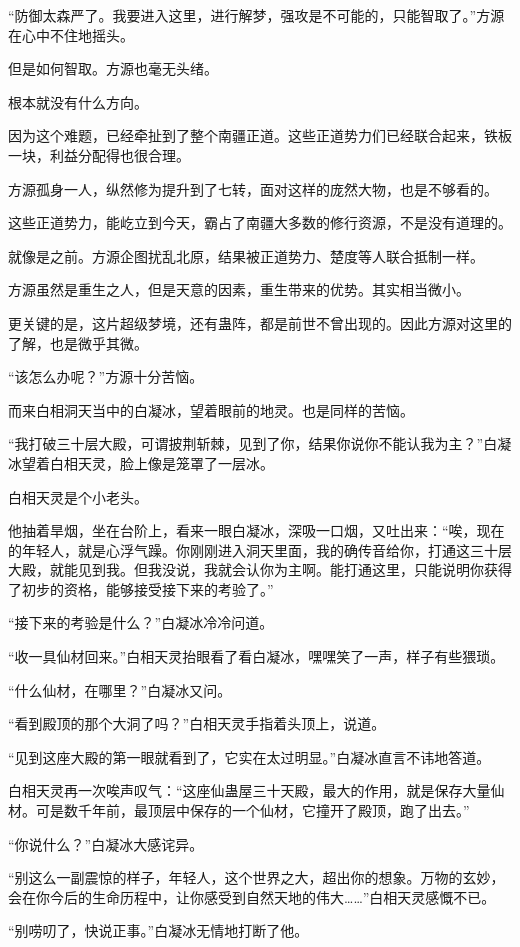 \begin{this_body}
“防御太森严了。我要进入这里，进行解梦，强攻是不可能的，只能智取了。”方源在心中不住地摇头。

但是如何智取。方源也毫无头绪。

根本就没有什么方向。

因为这个难题，已经牵扯到了整个南疆正道。这些正道势力们已经联合起来，铁板一块，利益分配得也很合理。

方源孤身一人，纵然修为提升到了七转，面对这样的庞然大物，也是不够看的。

这些正道势力，能屹立到今天，霸占了南疆大多数的修行资源，不是没有道理的。

就像是之前。方源企图扰乱北原，结果被正道势力、楚度等人联合抵制一样。

方源虽然是重生之人，但是天意的因素，重生带来的优势。其实相当微小。

更关键的是，这片超级梦境，还有蛊阵，都是前世不曾出现的。因此方源对这里的了解，也是微乎其微。

“该怎么办呢？”方源十分苦恼。

而来白相洞天当中的白凝冰，望着眼前的地灵。也是同样的苦恼。

“我打破三十层大殿，可谓披荆斩棘，见到了你，结果你说你不能认我为主？”白凝冰望着白相天灵，脸上像是笼罩了一层冰。

白相天灵是个小老头。

他抽着旱烟，坐在台阶上，看来一眼白凝冰，深吸一口烟，又吐出来：“唉，现在的年轻人，就是心浮气躁。你刚刚进入洞天里面，我的确传音给你，打通这三十层大殿，就能见到我。但我没说，我就会认你为主啊。能打通这里，只能说明你获得了初步的资格，能够接受接下来的考验了。”

“接下来的考验是什么？”白凝冰冷冷问道。

“收一具仙材回来。”白相天灵抬眼看了看白凝冰，嘿嘿笑了一声，样子有些猥琐。

“什么仙材，在哪里？”白凝冰又问。

“看到殿顶的那个大洞了吗？”白相天灵手指着头顶上，说道。

“见到这座大殿的第一眼就看到了，它实在太过明显。”白凝冰直言不讳地答道。

白相天灵再一次唉声叹气：“这座仙蛊屋三十天殿，最大的作用，就是保存大量仙材。可是数千年前，最顶层中保存的一个仙材，它撞开了殿顶，跑了出去。”

“你说什么？”白凝冰大感诧异。

“别这么一副震惊的样子，年轻人，这个世界之大，超出你的想象。万物的玄妙，会在你今后的生命历程中，让你感受到自然天地的伟大……”白相天灵感慨不已。

“别唠叨了，快说正事。”白凝冰无情地打断了他。


\end{this_body}
